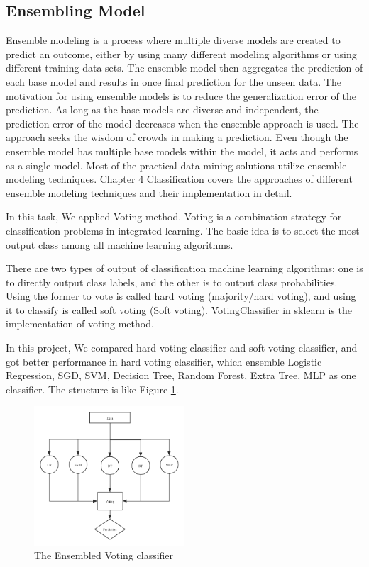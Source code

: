 \documentclass[11pt,en]{elegantpaper}
\begin{document}
\subsection{Ensembling Model}
Ensemble modeling is a process where multiple diverse models are created to predict an outcome, either by using many different modeling algorithms or using different training data sets. The ensemble model then aggregates the prediction of each base model and results in once final prediction for the unseen data. The motivation for using ensemble models is to reduce the generalization error of the prediction. As long as the base models are diverse and independent, the prediction error of the model decreases when the ensemble approach is used. The approach seeks the wisdom of crowds in making a prediction. Even though the ensemble model has multiple base models within the model, it acts and performs as a single model. Most of the practical data mining solutions utilize ensemble modeling techniques. Chapter 4 Classification covers the approaches of different ensemble modeling techniques and their implementation in detail.

In this task, We applied Voting method. Voting is a combination strategy for classification problems in integrated learning. The basic idea is to select the most output class among all machine learning algorithms.

There are two types of output of classification machine learning algorithms: one is to directly output class labels, and the other is to output class probabilities. Using the former to vote is called hard voting (majority/hard voting), and using it to classify is called soft voting (Soft voting). VotingClassifier in sklearn is the implementation of voting method.

In this project, We compared hard voting classifier and soft voting classifier, and got better performance in hard voting classifier, which ensemble Logistic Regression, SGD, SVM, Decision Tree, Random Forest, Extra Tree, MLP as one classifier. The structure is like Figure \ref{vcl}.

\begin{figure}[h]
	\centering
	\includegraphics[width=0.5\textwidth]{image/voting}
	\caption{The Ensembled Voting classifier}
	\label{vcl}
\end{figure}
\end{document}
